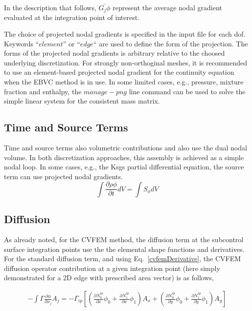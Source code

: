 In the description that follows, $\bar{G_j \phi}$ represent the average nodal 
gradient evaluated at the integration point of interest.

The choice of projected nodal gradients is specified in the input file for each dof.
Keywords ``$element$'' or ``$edge$`` are used to define the form of the projection. The
forms of the projected nodal gradients is arbitrary relative to the choosed underlying
discretization. For strongly non-orthoginal meshes, it is recommended to use an element-based
projected nodal gradient for the continuity equation when the EBVC method is in use. In some limited
cases, e.g., pressure, mixture fraction and enthalpy, the $manage-png$ line command can be used to
solve the simple linear system for the consistent mass matrix.

\subsection{Time and Source Terms}
Time and source terms also volumetric contributions and also use the dual nodal volume. In both
discretization approaches, this assembly is achieved
as a simple nodal loop. In some cases, e.g., the Ksgs partial differential equation, the
source term can use projected nodal gradients.
\begin{equation}
  \int \frac{\partial \rho \phi }{\partial t} dV = \int S_{\phi}dV 
\end{equation}

\subsection{Diffusion}
As already noted, for the CVFEM method, the diffusion term at the 
subcontrol surface integration points use the the elemental
shape functions and derivatives. For the standard diffusion term, 
and using  Eq.~\ref{cvfemDerivative}, the CVFEM diffusion operator
contribution at a given integration point (here simply demonstrated 
for a 2D edge with prescribed area vector) is as follows,

\begin{eqnarray}
  -\int \Gamma \frac{\partial \phi}{\partial x_j} A_j = - \Gamma_{ip} \left[ \left(\frac{\partial N^{ip}_0} {\partial x} \phi_0 + \frac{\partial N^{ip}_1} {\partial x} \phi_1 \right) A_x + \left(\frac{\partial N^{ip}_0} {\partial y} \phi_0 + \frac{\partial N^{ip}_1} {\partial y} \phi_1 \right) A_y \right]
\end{eqnarray}

